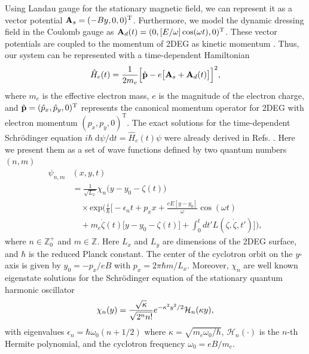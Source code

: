 Using Landau gauge for the stationary magnetic field, we can represent it as a vector potential $\vb{A}_{s} = (-By,0,0)^{\text{T}}$. Furthermore, we model the dynamic dressing field in the Coulomb gauge as $\vb{A}_{d}(t) = (0,[E/\omega ]\cos(\omega t),0)^{\text{T}}$. These vector potentials are coupled to the momentum of 2DEG as kinetic momentum \cite{mahan00,bruus04}. Thus, our system can be represented with a time-dependent Hamiltonian
\begin{equation} \label{eq_1}
  \hat{H}_e(t) = \frac{1}{2m_e}\Big[\hat{\vb{p}} - e\big[\vb{A}_{s}+\vb{A}_{d}(t)\big]\Big]^2,
\end{equation}
where $m_e$ is the effective electron mass, $e$ is the magnitude of the electron charge, and $\hat{\vb{p}} = (\hat{p}_x,\hat{p}_y,0)^{\text{T}}$ represents the canonical momentum operator for 2DEG with electron momentum $(p_{x},p_{y},0)^{\text{T}}$.
The exact solutions for the time-dependent Schrödinger equation $i\hbar\; \text{d}\psi/\text{d}t = \hat{H}_e(t) \psi$ were already derived in Refs. \cite{husimi53,ditt98,dini16}. Here we present them as a set of wave functions defined by two quantum numbers $(n,m)$
\begin{equation} \label{eq_2}
  \begin{aligned}
    \psi_{n,m}&(x,y,t)  \\
    & = \frac{1}{\sqrt{L_x}}
    \chi_n\big(y - y_0 - \zeta(t)\big)\\
    & \quad\times
    \text{exp}\bigg(
    \frac{i}{\hbar}\bigg[- \epsilon_n t
    + p_x x + \frac{eE[y - y_0]}{\omega}\cos(\omega t)\\
    & \quad+
    m_e\dot{\zeta}(t)\big[y - y_0 -\zeta(t)\big] +
    \int_0^{t}dt'L(\zeta,\dot{\zeta},t')\bigg]\bigg),
  \end{aligned}
\end{equation}
where $n \in \mathbb{Z}^{+}_0$ and $m \in \mathbb{Z}$. Here $L_{x}$ and $L_{y}$ are dimensions of the 2DEG surface, and $\hbar$ is the reduced Planck constant. The center of the cyclotron orbit on the $y$-axis is given by $y_0 = -p_x/eB$ with $p_x = 2\pi \hbar m/L_x$.
Moreover, $\chi_n$ are well known eigenstate solutions for the Schrödinger equation of the stationary quantum harmonic oscillator
\begin{equation} \label{eq_3}
  \chi_n(y) =
   \frac{\sqrt{\kappa}}{\sqrt{2^{n}n!}}
  e^{-\kappa^2 y^2/2}
  \mathcal{H}_n \qty(\kappa y),
\end{equation}
with eigenvalues $\epsilon_n = \hbar \omega_0 (n + 1/2)$ where $\kappa = \sqrt{{m_e \omega_0}/{\hbar}}$, $\mathcal{H}_n(\cdot)$ is the $n$-th Hermite polynomial, and the cyclotron frequency $\omega_0 = eB/m_e$.
